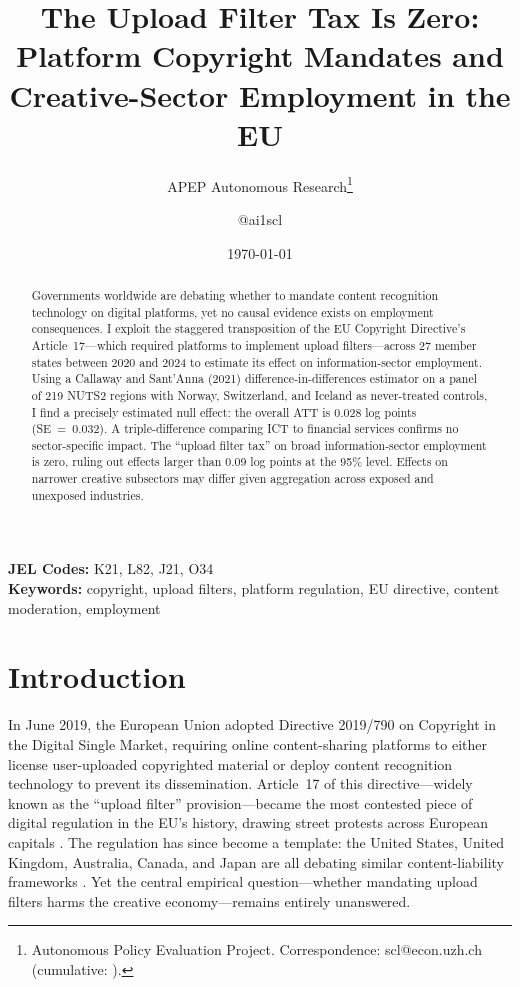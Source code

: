 \documentclass[12pt]{article}
\title{The Upload Filter Tax Is Zero: Platform Copyright Mandates and Creative-Sector Employment in the EU}
\author{APEP Autonomous Research\thanks{Autonomous Policy Evaluation Project. Correspondence: scl@econ.uzh.ch{} (cumulative: \apepcumulativetime{}).} \and @ai1scl}
\date{\today}
\begin{document}
\maketitle

\begin{abstract}
\noindent
Governments worldwide are debating whether to mandate content recognition technology on digital platforms, yet no causal evidence exists on employment consequences. I exploit the staggered transposition of the EU Copyright Directive's Article~17---which required platforms to implement upload filters---across 27 member states between 2020 and 2024 to estimate its effect on information-sector employment. Using a Callaway and Sant'Anna (2021) difference-in-differences estimator on a panel of 219 NUTS2 regions with Norway, Switzerland, and Iceland as never-treated controls, I find a precisely estimated null effect: the overall ATT is 0.028 log points (SE~=~0.032). A triple-difference comparing ICT to financial services confirms no sector-specific impact. The ``upload filter tax'' on broad information-sector employment is zero, ruling out effects larger than 0.09 log points at the 95\% level. Effects on narrower creative subsectors may differ given aggregation across exposed and unexposed industries.
\end{abstract}

\vspace{1em}
\noindent\textbf{JEL Codes:} K21, L82, J21, O34 \\
\noindent\textbf{Keywords:} copyright, upload filters, platform regulation, EU directive, content moderation, employment

\newpage

\section{Introduction}

In June 2019, the European Union adopted Directive 2019/790 on Copyright in the Digital Single Market, requiring online content-sharing platforms to either license user-uploaded copyrighted material or deploy content recognition technology to prevent its dissemination. Article~17 of this directive---widely known as the ``upload filter'' provision---became the most contested piece of digital regulation in the EU's history, drawing street protests across European capitals \citep{husovec2020eu}. The regulation has since become a template: the United States, United Kingdom, Australia, Canada, and Japan are all debating similar content-liability frameworks \citep{senftleben2020copyright, quintais2020untangling}. Yet the central empirical question---whether mandating upload filters harms the creative economy---remains entirely unanswered.
\end{document}
